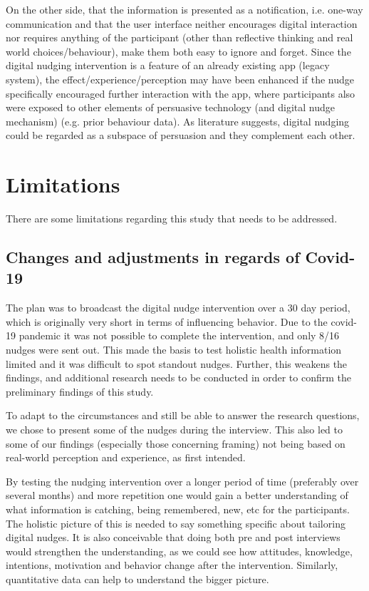 On the other side, that the information is presented as a notification, i.e. one-way communication and that the user interface neither encourages digital interaction nor requires anything of the participant (other than reflective thinking and real world choices/behaviour), make them both easy to ignore and forget. Since the digital nudging intervention is a feature of an already existing app (legacy system), the effect/experience/perception may have been enhanced if the nudge specifically encouraged further interaction with the app, where participants also were exposed to other elements of persuasive technology (and digital nudge mechanism) (e.g. prior behaviour data). As literature suggests, digital nudging could be regarded as a subspace of persuasion and they complement each other.  

\section{Limitations}
There are some limitations regarding this study that needs to be addressed.

\subsection{Changes and adjustments in regards of Covid-19 }
The plan was to broadcast the digital nudge intervention over a 30 day period, which is originally very short in terms of influencing behavior. Due to the covid-19 pandemic it was not possible to complete the intervention, and only 8/16 nudges were sent out. This made the basis to test holistic health information limited and it was difficult to spot standout nudges. Further, this weakens the findings, and additional research needs to be conducted in order to confirm the preliminary findings of this study. 

To adapt to the circumstances and still be able to answer the research questions, we chose to present some of the nudges during the interview. This also led to some of our findings (especially those concerning framing) not being based on real-world perception and experience, as first intended. 

By testing the nudging intervention over a longer period of time (preferably over several months) and more repetition one would gain a better understanding of what information is catching, being remembered, new, etc for the participants. The holistic picture of this is needed to say something specific about tailoring digital nudges. It is also conceivable that doing both pre and post interviews would strengthen the understanding, as we could see how attitudes, knowledge, intentions, motivation and behavior change after the intervention. Similarly, quantitative data can help to understand the bigger picture. 

